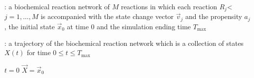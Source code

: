 \begin{algorithm}[H]
\DontPrintSemicolon
{}

\caption{\protect\TitleFunction{}}

\Input: a biochemical reaction network of $M$ reactions in which each reaction $R_j$< $j=1, \dots, M$ is accompanied with the state change vector $\vec{v}_j$ and the propensity $a_j$, the initial state $\vec{x}_0$ at time $0$ and the simulation ending time $T_{\max}$\;

\Output: a trajectory of the biochemical reaction network which is a collection of states $X(t)$ for time $0\le t\le T_{\max}$\;

$t = 0$\;
$\vec{X} = \vec{x}_0$\;


\label{algo:ssa-sketch}
\end{algorithm}

